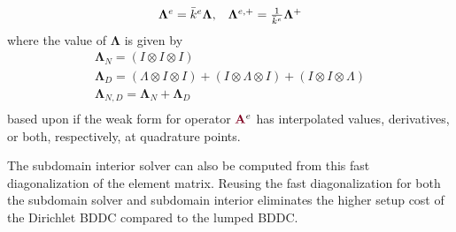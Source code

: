 \begin{definition}
\begin{equation}
\begin{array}{c c}
\mathbf{\Lambda}^e = \bar{k}^e \mathbf{\Lambda},  &  \mathbf{\Lambda}^{e, +} = \frac{1}{\bar{k}^e} \mathbf{\Lambda}^{+}
\end{array}
\end{equation}
where the value of $\mathbf{\Lambda}$ is given by
\begin{equation}
\begin{array}{c}
\mathbf{\Lambda}_N      = \left( I \otimes I \otimes I \right)  \\
\mathbf{\Lambda}_D      = \left( \Lambda \otimes I \otimes I\right) + \left( I \otimes \Lambda \otimes I\right) + \left( I \otimes I \otimes \Lambda \right)  \\
\mathbf{\Lambda}_{N, D} = \mathbf{\Lambda}_N + \mathbf{\Lambda}_D  \\
\end{array}
\end{equation}
based upon if the weak form for operator ${\color{burgundy}\mathbf{A}}^e$ has interpolated values, derivatives, or both, respectively, at quadrature points.
\end{definition}

The subdomain interior solver can also be computed from this fast diagonalization of the element matrix.
Reusing the fast diagonalization for both the subdomain solver and subdomain interior eliminates the higher setup cost of the Dirichlet BDDC compared to the lumped BDDC.

